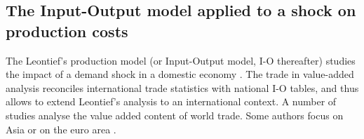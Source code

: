 \documentclass[11pt,a4paper]{article}
\begin{document}
\subsection{The Input-Output model applied to a shock on production costs} 
\label{subsec:io}
The Leontief's production model (or Input-Output model, I-O thereafter) studies the impact of a demand shock in a domestic economy \citep{Leontief1951}. 
The trade in value-added analysis reconciles international trade statistics with national I-O tables, and thus allows to extend Leontief's analysis to an international context. A number of studies \citep{Hummels2001,Daudin2006,Daudin2011, DeBacker2012,Johnson2012,Koopman2014, Amador2015,Los2016} analyse the value added content of world trade. Some authors focus on Asia \citep{Sato2014} or on the euro area \citep{Cappariello2015}.
\end{document}
